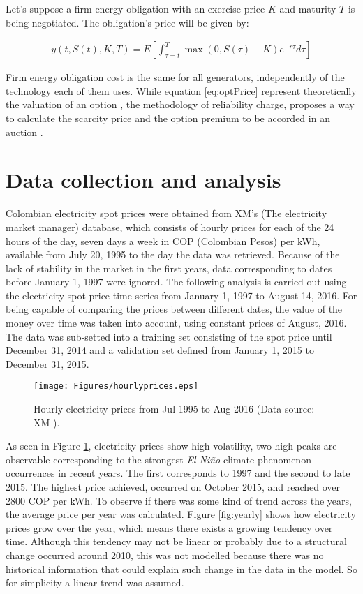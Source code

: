 \documentclass[3p]{elsarticle}
\begin{document}
Let's suppose a firm energy obligation with an exercise price $K$ and maturity $T$ is being negotiated. The obligation's price will be given by:

\begin{align}
\label{eq:optPrice}
y(t,S(t),K,T)=E\left [ \int_{\tau=t}^{T}\max(0,S(\tau)-K)e^{-r\tau}d\tau \right ]
\end{align}

Firm energy obligation cost is the same for all generators, independently of the technology each of them uses. While equation \ref{eq:optPrice} represent theoretically the valuation of an option \citep{Luenberger1998}, the methodology of reliability charge, proposes a way to calculate the scarcity price and the option premium to be accorded in an auction \citep{CREG2006}.

\section{Data collection and analysis}\label{ch:DCA}
Colombian electricity spot prices were obtained from XM's (The electricity market manager) database, which consists of hourly prices for each of the 24 hours of the day, seven days a week in COP (Colombian Pesos) per kWh, available from July 20, 1995 to the day the data was retrieved. Because of the lack of stability in the market in the first years, data corresponding to dates before January 1, 1997 were ignored. The following analysis is carried out using the electricity spot price time series from January 1, 1997 to August 14, 2016. For being capable of comparing the prices between different dates, the value of the money over time was taken into account, using constant prices of August, 2016. The data was sub-setted into a training set consisting of the spot price until December 31, 2014 and a validation set defined from January 1, 2015 to December 31, 2015.

\begin{figure}[!h]
\center
\texttt{[image: Figures/hourlyprices.eps]}
\caption{Hourly electricity prices from Jul 1995 to Aug 2016 (Data source: XM \cite{XM}).}
\label{fig:hourlyprice}
\end{figure}

As seen in Figure \ref{fig:hourlyprice}, electricity prices show high volatility, two high peaks are observable corresponding to the strongest \emph{El Ni\~no} climate phenomenon occurrences in recent years. The first corresponds to 1997 and the second to late 2015. The highest price achieved, occurred on October 2015, and reached over 2800 COP per kWh. To observe if there was some kind of trend across the years, the average price per year was calculated. Figure \ref{fig:yearly} shows how electricity prices grow over the year, which means there exists a growing tendency over time. Although this tendency may not be linear or probably due to a structural change occurred around 2010, this was not modelled because there was no historical information that could explain such change in the data in the model. So for simplicity a linear trend was assumed.
\end{document}
